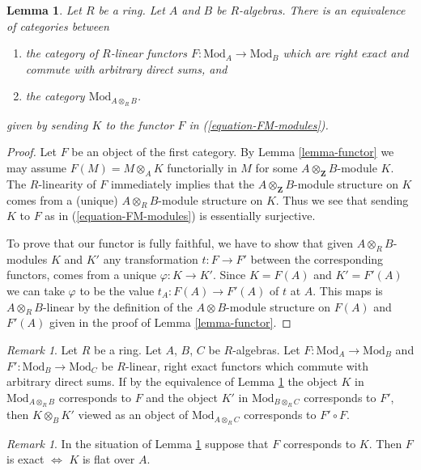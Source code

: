 \documentclass{stacks-project}
\theoremstyle{plain}
\newtheorem{lemma}[subsection]{Lemma}
\theoremstyle{definition}
\theoremstyle{remark}
\newtheorem{remark}[subsection]{Remark}
\numberwithin{equation}{subsection}
\begin{document}
\begin{lemma}
\label{lemma-functor-modules}
Let $R$ be a ring. Let $A$ and $B$ be $R$-algebras. There is an
equivalence of categories between
\begin{enumerate}
\item the category of $R$-linear functors
$F : \text{Mod}_A \to \text{Mod}_B$ which
are right exact and commute with arbitrary direct sums, and
\item the category $\text{Mod}_{A \otimes_R B}$.
\end{enumerate}
given by sending $K$ to the functor $F$ in (\ref{equation-FM-modules}).
\end{lemma}

\begin{proof}
Let $F$ be an object of the first category. By
Lemma \ref{lemma-functor} we may assume $F(M) = M \otimes_A K$
functorially in $M$ for some $A \otimes_\mathbf{Z} B$-module $K$.
The $R$-linearity of $F$ immediately implies that the
$A \otimes_\mathbf{Z} B$-module structure on $K$ comes
from a (unique) $A \otimes_R B$-module structure on $K$.
Thus we see that sending $K$ to $F$ as in (\ref{equation-FM-modules})
is essentially surjective.

\medskip\noindent
To prove that our functor is fully faithful, we have to show that
given $A \otimes_R B$-modules $K$ and $K'$ any transformation
$t : F \to F'$ between the corresponding functors, comes from
a unique $\varphi : K \to K'$. Since $K = F(A)$ and $K' = F'(A)$
we can take $\varphi$ to be the value $t_A : F(A) \to F'(A)$
of $t$ at $A$. This maps is $A \otimes_R B$-linear by the
definition of the $A \otimes B$-module structure on $F(A)$
and $F'(A)$ given in the proof of Lemma \ref{lemma-functor}.
\end{proof}

\begin{remark}
\label{remark-composition}
Let $R$ be a ring. Let $A$, $B$, $C$ be $R$-algebras.
Let $F : \text{Mod}_A \to \text{Mod}_B$ and
$F' : \text{Mod}_B \to \text{Mod}_C$ be
$R$-linear, right exact functors which commute with arbitrary direct sums.
If by the equivalence of Lemma \ref{lemma-functor-modules} the object
$K$ in $\text{Mod}_{A \otimes_R B}$ corresponds to $F$ and the object
$K'$ in $\text{Mod}_{B \otimes_R C}$ corresponds to $F'$, then
$K \otimes_B K'$ viewed as an object of
$\text{Mod}_{A \otimes_R C}$ corresponds to $F' \circ F$.
\end{remark}

\begin{remark}
\label{remark-exact-flat}
In the situation of Lemma \ref{lemma-functor-modules}
suppose that $F$ corresponds to $K$. Then
$F$ is exact $\Leftrightarrow$ $K$ is flat over $A$.
\end{remark}
\end{document}
